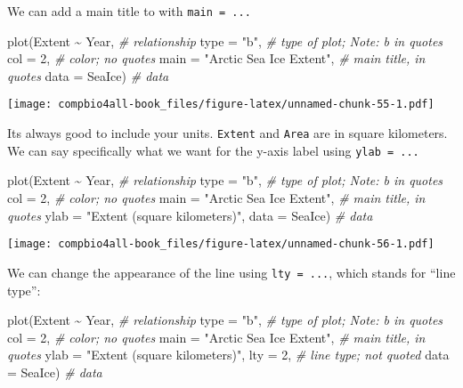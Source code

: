 \documentclass[
]{book}
\newenvironment{Shaded}{\begin{snugshade}}{\end{snugshade}}
\newcommand{\AttributeTok}[1]{\textcolor[rgb]{0.77,0.63,0.00}{#1}}
\newcommand{\CommentTok}[1]{\textcolor[rgb]{0.56,0.35,0.01}{\textit{#1}}}
\newcommand{\DecValTok}[1]{\textcolor[rgb]{0.00,0.00,0.81}{#1}}
\newcommand{\FunctionTok}[1]{\textcolor[rgb]{0.00,0.00,0.00}{#1}}
\newcommand{\NormalTok}[1]{#1}
\newcommand{\SpecialCharTok}[1]{\textcolor[rgb]{0.00,0.00,0.00}{#1}}
\newcommand{\StringTok}[1]{\textcolor[rgb]{0.31,0.60,0.02}{#1}}
\begin{document}
We can add a main title to with \texttt{main\ =\ ...}

\begin{Shaded}
\begin{Highlighting}[]
\FunctionTok{plot}\NormalTok{(Extent }\SpecialCharTok{\textasciitilde{}}\NormalTok{ Year,  }\CommentTok{\# relationship}
     \AttributeTok{type =} \StringTok{"b"}\NormalTok{,     }\CommentTok{\# type of plot; Note: b in quotes}
     \AttributeTok{col =} \DecValTok{2}\NormalTok{,        }\CommentTok{\# color; no quotes}
     \AttributeTok{main =} \StringTok{"Arctic Sea Ice Extent"}\NormalTok{, }\CommentTok{\# main title, in quotes}
     \AttributeTok{data =}\NormalTok{ SeaIce)  }\CommentTok{\# data}
\end{Highlighting}
\end{Shaded}

\texttt{[image: compbio4all-book\_files/figure-latex/unnamed-chunk-55-1.pdf]}

Its always good to include your units. \texttt{Extent} and \texttt{Area} are in square kilometers. We can say specifically what we want for the y-axis label using \texttt{ylab\ =\ ...}

\begin{Shaded}
\begin{Highlighting}[]
\FunctionTok{plot}\NormalTok{(Extent }\SpecialCharTok{\textasciitilde{}}\NormalTok{ Year,  }\CommentTok{\# relationship}
     \AttributeTok{type =} \StringTok{"b"}\NormalTok{,     }\CommentTok{\# type of plot; Note: b in quotes}
     \AttributeTok{col =} \DecValTok{2}\NormalTok{,        }\CommentTok{\# color; no quotes}
     \AttributeTok{main =} \StringTok{"Arctic Sea Ice Extent"}\NormalTok{, }\CommentTok{\# main title, in quotes}
     \AttributeTok{ylab =} \StringTok{"Extent (square kilometers)"}\NormalTok{,}
     \AttributeTok{data =}\NormalTok{ SeaIce)  }\CommentTok{\# data}
\end{Highlighting}
\end{Shaded}

\texttt{[image: compbio4all-book\_files/figure-latex/unnamed-chunk-56-1.pdf]}

We can change the appearance of the line using \texttt{lty\ =\ ...}, which stands for ``line type'':

\begin{Shaded}
\begin{Highlighting}[]
\FunctionTok{plot}\NormalTok{(Extent }\SpecialCharTok{\textasciitilde{}}\NormalTok{ Year,  }\CommentTok{\# relationship}
     \AttributeTok{type =} \StringTok{"b"}\NormalTok{,     }\CommentTok{\# type of plot; Note: b in quotes}
     \AttributeTok{col =} \DecValTok{2}\NormalTok{,        }\CommentTok{\# color; no quotes}
     \AttributeTok{main =} \StringTok{"Arctic Sea Ice Extent"}\NormalTok{, }\CommentTok{\# main title, in quotes}
     \AttributeTok{ylab =} \StringTok{"Extent (square kilometers)"}\NormalTok{,}
     \AttributeTok{lty =} \DecValTok{2}\NormalTok{,        }\CommentTok{\# line type; not quoted}
     \AttributeTok{data =}\NormalTok{ SeaIce)  }\CommentTok{\# data}
\end{Highlighting}
\end{Shaded}
\end{document}
